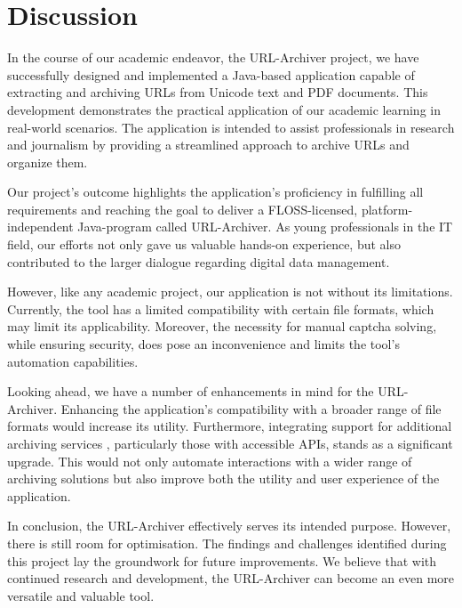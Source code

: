 \section{Discussion}
In the course of our academic endeavor, the URL-Archiver project, we have successfully designed and implemented a Java-based application capable of extracting and archiving URLs from Unicode text and PDF documents.
This development demonstrates the practical application of our academic learning in real-world scenarios.
The application is intended to assist professionals in research and journalism by providing a streamlined approach to archive URLs and organize them.

Our project's outcome highlights the application’s proficiency in fulfilling all requirements and reaching the goal to deliver a FLOSS-licensed, platform-independent Java-program called URL-Archiver.
As young professionals in the IT field, our efforts not only gave us valuable hands-on experience, but also contributed to the larger dialogue regarding digital data management.

However, like any academic project, our application is not without its limitations.
Currently, the tool has a limited compatibility with certain file formats, which may limit its applicability.
Moreover, the necessity for manual captcha solving, while ensuring security, does pose an inconvenience and limits the tool's automation capabilities.

Looking ahead, we have a number of enhancements in mind for the URL-Archiver.
Enhancing the application's compatibility with a broader range of file formats would increase its utility.
Furthermore, integrating support for additional archiving services , particularly those with accessible APIs, stands as a significant upgrade.
This would not only automate interactions with a wider range of archiving solutions but also improve both the utility and user experience of the application.

In conclusion, the URL-Archiver effectively serves its intended purpose. However, there is still room for optimisation.
The findings and challenges identified during this project lay the groundwork for future improvements.
We believe that with continued research and development, the URL-Archiver can become an even more versatile and valuable tool.
